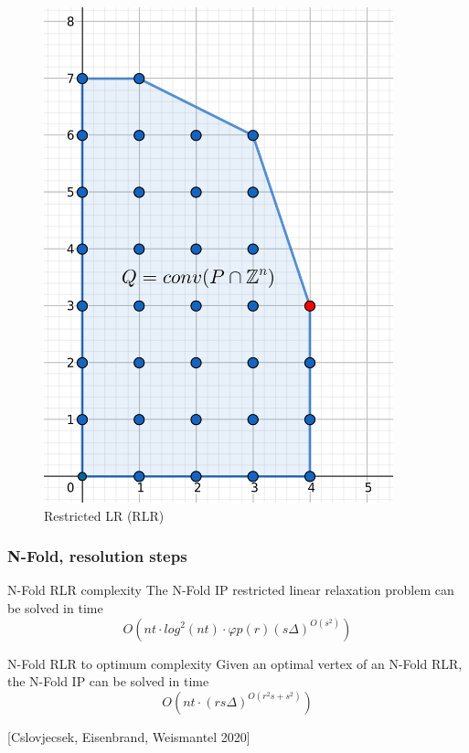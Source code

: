 \documentclass{beamer}
\begin{document}
\begin{frame}
\begin{figure}[!tbp]
\begin{minipage}[b]{0.45\textwidth}
            \includegraphics[width=0.9\textwidth]{images/IP(10).png}
            \caption{Restricted LR (RLR)}
        \end{minipage}
        \end{figure}
    \end{frame}
    \begin{frame}
        \frametitle{N-Fold, resolution steps}
        \begin{block}{N-Fold RLR complexity}
            The N-Fold IP restricted linear relaxation problem can be solved in time
            \begin{equation*}
                O(nt \cdot log^2(nt) \cdot \varphi p(r) (s\Delta)^{O(s^2)})
            \end{equation*}
        \end{block}
        \vspace{0.5cm}
        \begin{block}{N-Fold RLR to optimum complexity}
            Given an optimal vertex of an N-Fold RLR, the N-Fold IP can be solved in time
            \begin{equation*}
                O(nt \cdot (rs\Delta)^{O(r^2s+s^2)})
            \end{equation*}
        \end{block}
        [Cslovjecsek, Eisenbrand, Weismantel 2020]
    \end{frame}
\end{document}
